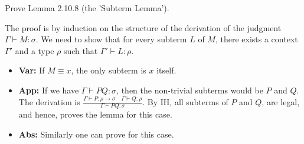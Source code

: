 \begin{problem}{2.16}
    Prove Lemma 2.10.8 (the 'Subterm Lemma').
\end{problem}

\begin{solution}
    The proof is by induction on the structure of the derivation of the judgment $\Gamma \vdash M:\sigma$.
    We need to show that for every subterm $L$ of $M$, there exists a context $\Gamma'$ and a type $\rho$ such that $\Gamma' \vdash L:\rho$.
    \begin{itemize}
        \item \textbf{Var:} If $M \equiv x$, the only subterm is $x$ itself.
        \item \textbf{App:} If we have $\Gamma \vdash PQ : \sigma$, then the non-trivial subterms would be $P$ and $Q$.
                The derivation is $\frac{\Gamma \vdash P:\rho \to \sigma \quad \Gamma \vdash Q : \rho}{\Gamma \vdash PQ : \sigma}$. By IH, all subterms of $P$ and $Q$, are legal, and hence, proves the lemma for this case.
        \item \textbf{Abs:} Similarly one can prove for this case. 
    \end{itemize}
\end{solution}